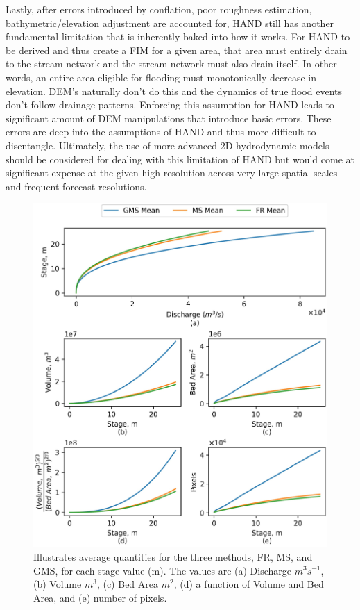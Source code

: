 Lastly, after errors introduced by conflation, poor roughness estimation, bathymetric/elevation adjustment are accounted for, HAND still has another fundamental limitation that is inherently baked into how it works.
For HAND to be derived and thus create a FIM for a given area, that area must entirely drain to the stream network and the stream network must also drain itself.
In other words, an entire area eligible for flooding must monotonically decrease in elevation. 
DEM's naturally don't do this and the dynamics of true flood events don't follow drainage patterns.
Enforcing this assumption for HAND leads to significant amount of DEM manipulations that introduce basic errors.
These errors are deep into the assumptions of HAND and thus more difficult to disentangle.
Ultimately, the use of more advanced 2D hydrodynamic models should be considered for dealing with this limitation of HAND but would come at significant expense at the given high resolution across very large spatial scales and frequent forecast resolutions.
%
\begin{figure}[H]
\centering
\includegraphics[scale=1.0]{figures/rating_curve_comparison.jpg}
\caption{Illustrates average quantities for the three methods, FR, MS, and GMS, for each stage value (m). 
The values are (a) Discharge $m^3s^{-1}$, (b) Volume $m^3$, (c) Bed Area $m^2$, (d) a function of Volume and Bed Area, and (e) number of pixels.
}
\label{fig:rating_curve_comparison}
\end{figure}
